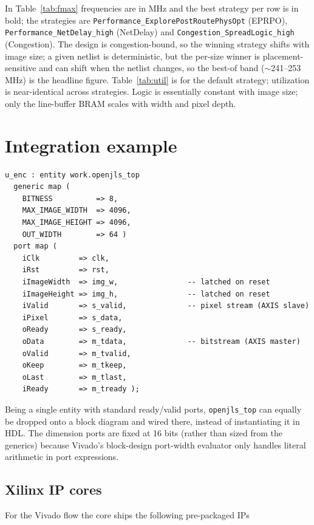 \documentclass[10pt,a4paper]{article}
\begin{document}
\begin{sloppypar}
\noindent In Table~\ref{tab:fmax} frequencies are in MHz and the best strategy
per row is in bold; the strategies are \texttt{Performance\_\allowbreak Explore\allowbreak PostRoute\allowbreak PhysOpt}
(EPRPO), \texttt{Performance\_\allowbreak NetDelay\_\allowbreak high} (NetDelay) and
\texttt{Congestion\_\allowbreak SpreadLogic\_\allowbreak high} (Congestion). The design is congestion-bound,
so the winning strategy shifts with image size; a given netlist is deterministic,
but the per-size winner is placement-sensitive and can shift when the netlist
changes, so the best-of band ($\sim$241--253\,MHz) is the headline figure. Table~\ref{tab:util} is for the default
strategy; utilization is near-identical across strategies. Logic is essentially
constant with image size; only the line-buffer BRAM scales with width and pixel
depth.
\end{sloppypar}

\section{Integration example}
\begin{lstlisting}
u_enc : entity work.openjls_top
  generic map (
    BITNESS          => 8,
    MAX_IMAGE_WIDTH  => 4096,
    MAX_IMAGE_HEIGHT => 4096,
    OUT_WIDTH        => 64 )
  port map (
    iClk         => clk,
    iRst         => rst,
    iImageWidth  => img_w,                -- latched on reset
    iImageHeight => img_h,                -- latched on reset
    iValid       => s_valid,              -- pixel stream (AXIS slave)
    iPixel       => s_data,
    oReady       => s_ready,
    oData        => m_tdata,              -- bitstream (AXIS master)
    oValid       => m_tvalid,
    oKeep        => m_tkeep,
    oLast        => m_tlast,
    iReady       => m_tready );
\end{lstlisting}

\noindent Being a single entity with standard ready/valid ports, \texttt{openjls\_top}
can equally be dropped onto a block diagram and wired there, instead of instantiating
it in HDL. The dimension ports are fixed at 16 bits (rather than sized from the
generics) because Vivado's block-design port-width evaluator only handles literal
arithmetic in port expressions.

\subsection{Xilinx IP cores}
For the Vivado flow the core ships the following pre-packaged IPs
\end{document}
